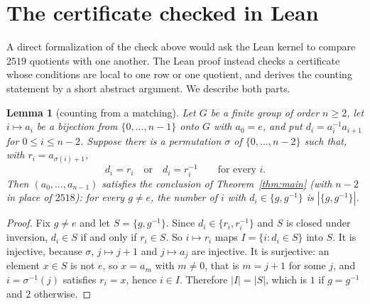 \documentclass[11pt]{article}
\newtheorem{lemma}{Lemma}
\theoremstyle{definition}
\theoremstyle{remark}
\begin{document}
\section{The certificate checked in Lean}\label{sec:cert}

A direct formalization of the check above would ask the Lean kernel to
compare $2519$ quotients with one another. The Lean proof instead checks a
certificate whose conditions are local to one row or one quotient, and derives
the counting statement by a short abstract argument. We describe both parts.

\begin{lemma}[counting from a matching]\label{lem:matching}
Let $G$ be a finite group of order $n\ge2$, let $i\mapsto a_i$ be a bijection
from $\{0,\dots,n-1\}$ onto $G$ with $a_0=e$, and put
$d_i=a_i^{-1}a_{i+1}$ for $0\le i\le n-2$. Suppose there is a permutation
$\sigma$ of $\{0,\dots,n-2\}$ such that, with $r_i=a_{\sigma(i)+1}$,
\[
d_i=r_i\quad\text{or}\quad d_i=r_i^{-1}\qquad\text{for every } i .
\]
Then $(a_0,\dots,a_{n-1})$ satisfies the conclusion of
Theorem~\ref{thm:main} (with $n-2$ in place of $2518$): for every $g\ne e$,
the number of $i$ with $d_i\in\{g,g^{-1}\}$ is $|\{g,g^{-1}\}|$.
\end{lemma}

\begin{proof}
Fix $g\ne e$ and let $S=\{g,g^{-1}\}$. Since $d_i\in\{r_i,r_i^{-1}\}$ and $S$
is closed under inversion, $d_i\in S$ if and only if $r_i\in S$. So
$i\mapsto r_i$ maps $I=\{i:d_i\in S\}$ into $S$. It is injective, because
$\sigma$, $j\mapsto j+1$ and $j\mapsto a_j$ are injective. It is surjective:
an element $x\in S$ is not $e$, so $x=a_m$ with $m\ne0$, that is $m=j+1$ for
some $j$, and $i=\sigma^{-1}(j)$ satisfies $r_i=x$, hence $i\in I$. Therefore
$|I|=|S|$, which is $1$ if $g=g^{-1}$ and $2$ otherwise.
\end{proof}
\end{document}
